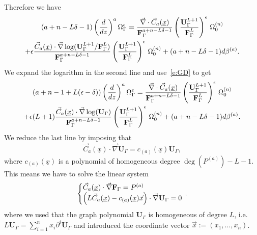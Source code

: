 \documentclass[a4paper,12pt]{article}
\numberwithin{equation}{section}
\numberwithin{figure}{section}
\begin{document}
Therefore we have
\begin{multline}
  (a+n-L\delta-1)   \left(d\over dz\right)^a
 \Omega_\Gamma^\epsilon= {
     \vec\nabla\cdot \vec C_{a}
     (\underline x)
    \over   \textbf{F}_\Gamma^{a+n-L\delta-1}}\left(\textbf{U}_\Gamma^{L+1}\over
    \textbf{F}_\Gamma^L \right)^\epsilon\, \Omega_0^{(n)}\cr
  +\epsilon {
     \vec C_{a}
     (\underline x) \cdot \vec\nabla \log(\textbf{U}_\Gamma^{L+1}/
    \textbf{F}_\Gamma^L )
    \over   \textbf{F}_\Gamma^{a+n-L\delta-1}}\left(\textbf{U}_\Gamma^{L+1}\over
    \textbf{F}_\Gamma^L \right)^\epsilon\, \Omega_0^{(n)}+(a+n-L\delta-1) d\beta^{(a)}.
\end{multline}
We expand the logarithm in the second line and use~\eqref{e:GD} to
get
\begin{multline}
 (a+n-1+L(\epsilon-\delta))   \left(d\over dz\right)^a
 \Omega_\Gamma^\epsilon= {
     \vec\nabla \cdot \vec C_{a}
     (\underline x)
    \over   \textbf{F}_\Gamma^{a+n-L\delta-1}}\left(\textbf{U}_\Gamma^{L+1}\over
    \textbf{F}_\Gamma^L \right)^\epsilon\, \Omega_0^{(n)}\cr
  +\epsilon(L+1) {
    \vec C_{a}
     (\underline x) \cdot\vec\nabla\log(\textbf{U}_\Gamma)
    \over   \textbf{F}_\Gamma^{a+n-L\delta-1}}\left(\textbf{U}_\Gamma^{L+1}\over
    \textbf{F}_\Gamma^L \right)^\epsilon\, \Omega_0^{(n)}+(a+n-L\delta-1)  d\beta^{(a)}.
\end{multline}
We reduce the last line by imposing that
\begin{equation}\label{e:RedU}
 \vec C_{a}(\underline x)\cdot\vec\nabla\textbf{U}_\Gamma  =c_{(a)}(\underline x)  \textbf{U}_\Gamma,
\end{equation}
where $c_{(a)}(\underline x) $ is a polynomial of homogeneous degree $\deg(P^{(a)})-L-1$.
%
This means we have to solve the linear system
\begin{equation}\label{e:sysCFU}
   \left\{\begin{array}{@{}l@{}}
\vec C_a(\underline x) \cdot \vec \nabla \textbf{F}_\Gamma  =    P^{(a)}\\
 \left(L\vec C_{a}(\underline x)-c_{(a)}(\underline x) \vec x\right)\cdot\vec\nabla\textbf{U}_\Gamma  =0
  \end{array}\right.\,.
\end{equation}
where we used that the graph polynomial $\textbf{U}_\Gamma $ is
homogeneous of degree $L$,  i.e. $L\textbf{U}_\Gamma = \sum_{i=1}^n
x_i \partial^i \textbf{U}_\Gamma$ and introduced the coordinate vector
$\vec x:=(x_1,\dots,x_n)$.
\end{document}
